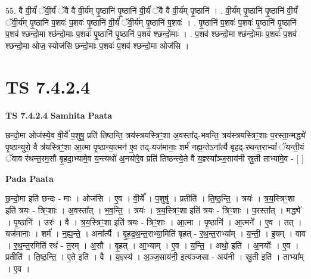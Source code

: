 \documentclass[17pt]{extarticle}
\begin{document}
55. वै वी॒र्यं॑ ॅवी॒र्यं॑ ॅवै वै वी॒र्य॑म् पृ॒ष्ठानि॑ पृ॒ष्ठानि॑ वी॒र्यं॑ ॅवै वै वी॒र्य॑म् पृ॒ष्ठानि॑ । . वी॒र्य॑म् पृ॒ष्ठानि॑ पृ॒ष्ठानि॑ वी॒र्यं॑ ॅवी॒र्य॑म् पृ॒ष्ठानि॑ प॒शवः॑ प॒शवः॑ पृ॒ष्ठानि॑ वी॒र्यं॑ ॅवी॒र्य॑म् पृ॒ष्ठानि॑ प॒शवः॑ । . पृ॒ष्ठानि॑ प॒शवः॑ प॒शवः॑ पृ॒ष्ठानि॑ पृ॒ष्ठानि॑ प॒शव॑ श्छन्दो॒मा श्छ॑न्दो॒माः प॒शवः॑ पृ॒ष्ठानि॑ पृ॒ष्ठानि॑ प॒शव॑ श्छन्दो॒माः । . प॒शव॑ श्छन्दो॒मा श्छ॑न्दो॒माः प॒शवः॑ प॒शव॑ श्छन्दो॒मा ओज॒ स्योज॑सि छन्दो॒माः प॒शवः॑ प॒शव॑ श्छन्दो॒मा ओज॑सि । \newline
\pagebreak
{}

\section{ TS 7.4.2.4 }

\textbf{TS 7.4.2.4 } \newline
\textbf{Samhita Paata} \newline

छन्दो॒मा ओज॑स्ये॒व वी॒र्ये॑ प॒शुषु॒ प्रति॑ तिष्ठन्ति॒ त्रय॑स्त्रयस्त्रिꣳ॒॒शा अ॒वस्ता᳚द्-भवन्ति॒ त्रय॑स्त्रयस्त्रिꣳ॒॒शाः प॒रस्ता॒न्मद्ध्ये॑ पृ॒ष्ठान्युरो॒ वै त्र॑यस्त्रिꣳ॒॒शा आ॒त्मा पृ॒ष्ठान्या॒त्मन॑ ए॒व तद्-यज॑मानाः॒ शर्म॑ नह्य॒न्तेऽना᳚र्त्यै बृहद्-रथन्त॒राभ्यां᳚ ॅयन्ती॒यं ॅवाव र॑थन्त॒रम॒सौ बृ॒हदा॒भ्यामे॒व य॒न्त्यथो॑ अ॒नयो॑रे॒व प्रति॑ तिष्ठन्त्ये॒ते वै य॒ज्ञ्स्या᳚ञ्ज॒साय॑नी स्रु॒ती ताभ्या॑मे॒व - [  ] \newline

\textbf{Pada Paata} \newline

छ॒न्दो॒मा इति॑ छन्दः - माः । ओज॑सि । ए॒व । वी॒र्ये᳚ । प॒शुषु॑ । प्रतीति॑ । ति॒ष्ठ॒न्ति॒ । त्रयः॑ । त्र॒य॒स्त्रिꣳ॒॒शा इति॑ त्रयः - त्रिꣳ॒॒शाः । अ॒वस्ता᳚त् । भ॒व॒न्ति॒ । त्रयः॑ । त्र॒य॒स्त्रिꣳ॒॒शा इति॑ त्रयः - त्रिꣳ॒॒शाः । प॒रस्ता᳚त् । मद्ध्ये᳚ । पृ॒ष्ठानि॑ । उरः॑ । वै । त्र॒य॒स्त्रिꣳ॒॒शा इति॑ त्रयः - त्रिꣳ॒॒शाः । आ॒त्मा । पृ॒ष्ठानि॑ । आ॒त्मने᳚ । ए॒व । तत् । यज॑मानाः । शर्म॑ । न॒ह्य॒न्ते॒ । अना᳚र्त्यै । बृ॒ह॒द्र॒थ॒न्त॒राभ्या॒मिति॑ बृहत् - र॒थ॒न्त॒राभ्या᳚म् । य॒न्ती॒ । इ॒यम् । वाव । र॒थ॒न्त॒रमिति॑ रथं - त॒रम् । अ॒सौ । बृ॒हत् । आ॒भ्याम् । ए॒व । य॒न्ति॒ । अथो॒ इति॑ । अ॒नयोः᳚ । ए॒व । प्रतीति॑ । ति॒ष्ठ॒न्ति॒ । ए॒ते इति॑ । वै । य॒ज्ञ्स्य॑ । अ॒ञ्ज॒साय॑नी॒ इत्य॑ञ्जसा - अय॑नी । स्रु॒ती इति॑ । ताभ्या᳚म् । ए॒व ।  \newline
\end{document}
